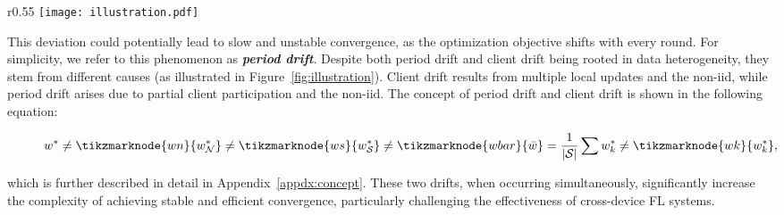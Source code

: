 \begin{wrapfigure}{r}{0.55\textwidth}
   \vspace{-3mm}
   \centering
   \texttt{[image: illustration.pdf]}
   \vspace{-3mm}
   \caption{\small\textbf{The generation of period drift and client drift}}
   \label{fig:illustration}
   \vspace{-3mm}
\end{wrapfigure}

This deviation could potentially lead to slow and unstable convergence, as the optimization objective shifts with every round. For simplicity, we refer to this phenomenon as \textit{\textbf{period drift}}. Despite both period drift and client drift being rooted in data heterogeneity, they stem from different causes (as illustrated in Figure~\ref{fig:illustration}). Client drift results from multiple local updates and the non-iid, while period drift arises due to partial client participation and the non-iid. 
The concept of period drift and client drift is shown in the following equation:

\begin{figure}[h]
   \vspace{-5mm}
\begin{equation}
   w^* \neq \tikzmarknode{wn}{w^* _ {\mathcal{N}}} \neq \tikzmarknode{ws}{w^* _ {\mathcal{S}}} \neq \tikzmarknode{wbar}{\bar{w}} =\frac{1}{|\mathcal{S}|}\sum w_k^*  \neq \tikzmarknode{wk}{w_k^*},
\end{equation}
   
\end{figure}
which is further described in detail in Appendix~\ref{appdx:concept}. These two drifts, when occurring simultaneously, significantly increase the complexity of achieving stable and efficient convergence, particularly challenging the effectiveness of cross-device FL systems.

